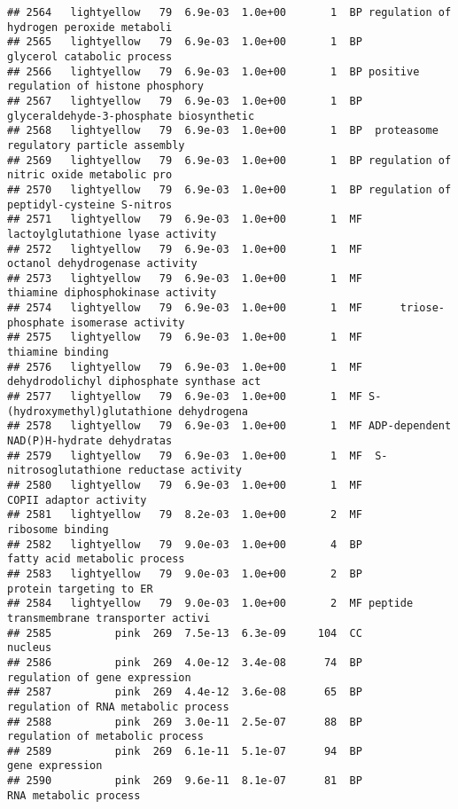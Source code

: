 \documentclass[]{article}
\begin{document}
\begin{verbatim}
## 2564   lightyellow   79  6.9e-03  1.0e+00       1  BP regulation of hydrogen peroxide metaboli
## 2565   lightyellow   79  6.9e-03  1.0e+00       1  BP               glycerol catabolic process
## 2566   lightyellow   79  6.9e-03  1.0e+00       1  BP positive regulation of histone phosphory
## 2567   lightyellow   79  6.9e-03  1.0e+00       1  BP glyceraldehyde-3-phosphate biosynthetic 
## 2568   lightyellow   79  6.9e-03  1.0e+00       1  BP  proteasome regulatory particle assembly
## 2569   lightyellow   79  6.9e-03  1.0e+00       1  BP regulation of nitric oxide metabolic pro
## 2570   lightyellow   79  6.9e-03  1.0e+00       1  BP regulation of peptidyl-cysteine S-nitros
## 2571   lightyellow   79  6.9e-03  1.0e+00       1  MF        lactoylglutathione lyase activity
## 2572   lightyellow   79  6.9e-03  1.0e+00       1  MF           octanol dehydrogenase activity
## 2573   lightyellow   79  6.9e-03  1.0e+00       1  MF        thiamine diphosphokinase activity
## 2574   lightyellow   79  6.9e-03  1.0e+00       1  MF      triose-phosphate isomerase activity
## 2575   lightyellow   79  6.9e-03  1.0e+00       1  MF                         thiamine binding
## 2576   lightyellow   79  6.9e-03  1.0e+00       1  MF dehydrodolichyl diphosphate synthase act
## 2577   lightyellow   79  6.9e-03  1.0e+00       1  MF S-(hydroxymethyl)glutathione dehydrogena
## 2578   lightyellow   79  6.9e-03  1.0e+00       1  MF ADP-dependent NAD(P)H-hydrate dehydratas
## 2579   lightyellow   79  6.9e-03  1.0e+00       1  MF  S-nitrosoglutathione reductase activity
## 2580   lightyellow   79  6.9e-03  1.0e+00       1  MF                   COPII adaptor activity
## 2581   lightyellow   79  8.2e-03  1.0e+00       2  MF                         ribosome binding
## 2582   lightyellow   79  9.0e-03  1.0e+00       4  BP             fatty acid metabolic process
## 2583   lightyellow   79  9.0e-03  1.0e+00       2  BP                  protein targeting to ER
## 2584   lightyellow   79  9.0e-03  1.0e+00       2  MF peptide transmembrane transporter activi
## 2585          pink  269  7.5e-13  6.3e-09     104  CC                                  nucleus
## 2586          pink  269  4.0e-12  3.4e-08      74  BP            regulation of gene expression
## 2587          pink  269  4.4e-12  3.6e-08      65  BP      regulation of RNA metabolic process
## 2588          pink  269  3.0e-11  2.5e-07      88  BP          regulation of metabolic process
## 2589          pink  269  6.1e-11  5.1e-07      94  BP                          gene expression
## 2590          pink  269  9.6e-11  8.1e-07      81  BP                    RNA metabolic process

\end{verbatim}
\end{document}
